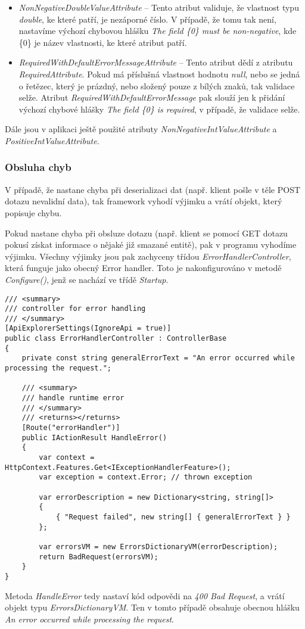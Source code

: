 \begin{itemize}
\item \textit{NonNegativeDoubleValueAttribute} -- Tento atribut validuje, že vlastnost typu \textit{double}, ke které patří, je nezáporné číslo. V případě, že tomu tak není, nastavíme výchozí chybovou hlášku \textit{The field \{0\} must be non-negative}, kde \{0\} je název vlastnosti, ke které atribut patří.

\item \textit{RequiredWithDefaultErrorMessageAttribute} -- Tento atribut dědí z atributu \textit{RequiredAttribute}. Pokud má příslušná vlastnost hodnotu \textit{null}, nebo se jedná o řetězec, který je prázdný, nebo složený pouze z bílých znaků, tak validace selže. Atribut \textit{RequiredWithDefaultErrorMessage} pak slouží jen k přidání výchozí chybové hlášky \textit{The field \{0\} is required}, v případě, že validace selže.

\end{itemize}

Dále jsou v aplikaci ještě použité atributy \textit{NonNegativeIntValueAttribute} a \textit{PositiveIntValueAttribute}.


\subsubsection*{Obsluha chyb}

V případě, že nastane chyba při deserializaci dat (např. klient pošle v těle POST dotazu nevalidní data), tak framework vyhodí výjimku a vrátí objekt, který popisuje chybu. \cite{AspNetCoreDocs}

Pokud nastane chyba při obsluze dotazu (např. klient se pomocí GET dotazu pokusí získat informace o nějaké již smazané entitě), pak v programu vyhodíme výjimku. Všechny výjimky jsou pak zachyceny třídou \textit{ErrorHandlerController}, která funguje jako obecný Error handler.
Toto je nakonfigurováno v metodě \textit{Configure()}, jenž se nachází ve třídě \textit{Startup}.
\begin{lstlisting}
/// <summary>
/// controller for error handling
/// </summary>
[ApiExplorerSettings(IgnoreApi = true)]
public class ErrorHandlerController : ControllerBase
{
	private const string generalErrorText = "An error occurred while processing the request.";
	
	/// <summary>
	/// handle runtime error
	/// </summary>
	/// <returns></returns>
	[Route("errorHandler")]
	public IActionResult HandleError()
	{
		var context = HttpContext.Features.Get<IExceptionHandlerFeature>();
		var exception = context.Error; // thrown exception
		
		var errorDescription = new Dictionary<string, string[]>
		{
			{ "Request failed", new string[] { generalErrorText } }
		};
		
		var errorsVM = new ErrorsDictionaryVM(errorDescription);
		return BadRequest(errorsVM);
	}
}
\end{lstlisting}
Metoda \textit{HandleError} tedy nastaví kód odpovědi na \textit{400 Bad Request}, a vrátí objekt typu \textit{ErrorsDictionaryVM}.
Ten v tomto případě obsahuje obecnou hlášku \textit{An error occurred while processing the request}.

